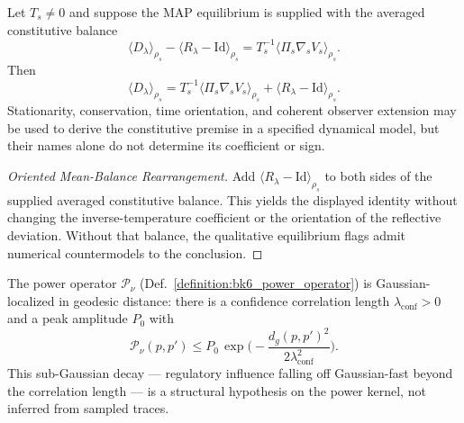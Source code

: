 \begin{theorem}
\label{theorem:bk6_thermodynamic_map_duality}
Let $T_s\neq0$ and suppose the MAP equilibrium is supplied with the averaged
constitutive balance
\[
 \langle D_\lambda\rangle_{\rho_s}
 -\langle R_\lambda-\mathrm{Id}\rangle_{\rho_s}
 =T_s^{-1}\langle\Pi_s\nabla_sV_s\rangle_{\rho_s}.
\]
Then
\[
 \langle D_\lambda\rangle_{\rho_s}
 =T_s^{-1}\langle\Pi_s\nabla_sV_s\rangle_{\rho_s}
  +\langle R_\lambda-\mathrm{Id}\rangle_{\rho_s}.
\]
Stationarity, conservation, time orientation, and coherent observer extension
may be used to derive the constitutive premise in a specified dynamical model,
but their names alone do not determine its coefficient or sign.
\end{theorem}
\begin{proof}[Oriented Mean-Balance Rearrangement]
\label{proof:bk6_thermodynamic_map_duality}
\leavevmode
Add $\langle R_\lambda-\mathrm{Id}\rangle_{\rho_s}$ to both sides of the
supplied averaged constitutive balance.  This yields the displayed identity
without changing the inverse-temperature coefficient or the orientation of
the reflective deviation.  Without that balance, the qualitative equilibrium
flags admit numerical countermodels to the conclusion.
\end{proof}

\begin{assumption}
\label{assumption:bk6_gaussian_locality}
The power operator $\mathcal{P}_\nu$ (Def.~\ref{definition:bk6_power_operator}) is Gaussian-localized in geodesic distance: there is a confidence correlation length $\lambda_{\text{conf}}>0$ and a peak amplitude $P_0$ with
\[
\mathcal{P}_\nu(p,p')\le P_0\,\exp\!\Big(-\frac{d_g(p,p')^2}{2\lambda_{\text{conf}}^2}\Big).
\]
This sub-Gaussian decay --- regulatory influence falling off Gaussian-fast beyond the correlation length --- is a structural hypothesis on the power kernel, not inferred from sampled traces.
\end{assumption}

